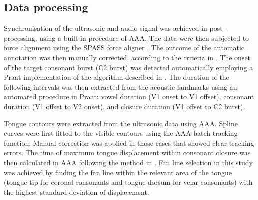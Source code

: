 \documentclass[authoryear, twocolumn]{elsarticle}
\begin{document}
\subsection{Data processing}\label{data-processing}

Synchronisation of the ultrasonic and audio signal was achieved in
post-processing, using a built-in procedure of AAA. The data were then
subjected to force alignment using the SPASS force aligner
\citep{bigi2015}. The outcome of the automatic annotation was then
manually corrected, according to the criteria in .
The onset of the target consonant burst (C2 burst) was detected
automatically employing a Praat \citep{boersma2016} implementation of
the algorithm described in \citet{ananthapadmanabha2014}. The duration
of the following intervals was then extracted from the acoustic
landmarks using an automated procedure in Praat: vowel duration (V1
onset to V1 offset), consonant duration (V1 offset to V2 onset), and
closure duration (V1 offset to C2 burst).


Tongue contours were extracted from the ultrasonic data using AAA.
Spline curves were first fitted to the visible contours using the AAA
batch tracking function. Manual correction was applied in those cases
that showed clear tracking errors. The time of maximum tongue
displacement within consonant closure was then calculated in AAA
following the method in \citet{strycharczuk2015}. Fan line selection in
this study was achieved by finding the fan line within the relevant area
of the tongue (tongue tip for coronal consonants and tongue dorsum for
velar consonants) with the highest standard deviation of displacement.
\end{document}
